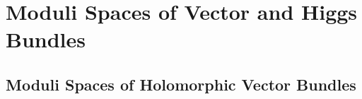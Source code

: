 \chapter{Moduli Spaces of Vector and Higgs Bundles}

\section{Moduli Spaces of Holomorphic Vector Bundles}

